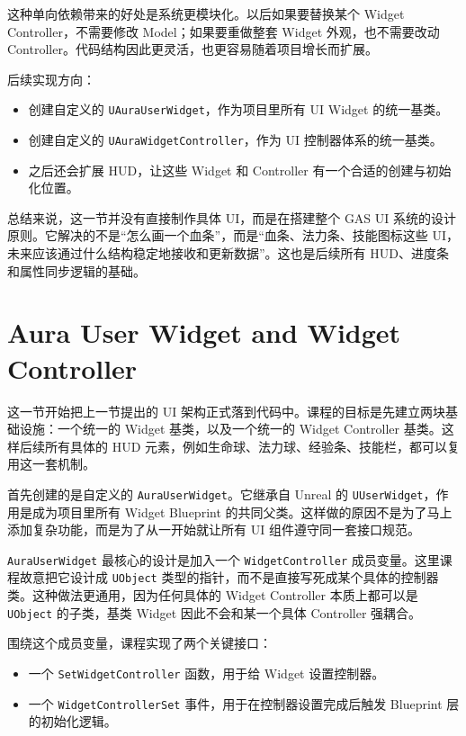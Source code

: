 这种单向依赖带来的好处是系统更模块化。以后如果要替换某个 Widget Controller，不需要修改 Model；如果要重做整套 Widget 外观，也不需要改动 Controller。代码结构因此更灵活，也更容易随着项目增长而扩展。

后续实现方向：
\begin{itemize}
	\item 创建自定义的 \texttt{UAuraUserWidget}，作为项目里所有 UI Widget 的统一基类。
	\item 创建自定义的 \texttt{UAuraWidgetController}，作为 UI 控制器体系的统一基类。
	\item 之后还会扩展 HUD，让这些 Widget 和 Controller 有一个合适的创建与初始化位置。
\end{itemize}

总结来说，这一节并没有直接制作具体 UI，而是在搭建整个 GAS UI 系统的设计原则。它解决的不是“怎么画一个血条”，而是“血条、法力条、技能图标这些 UI，未来应该通过什么结构稳定地接收和更新数据”。这也是后续所有 HUD、进度条和属性同步逻辑的基础。
\section{Aura User Widget and Widget Controller}

这一节开始把上一节提出的 UI 架构正式落到代码中。课程的目标是先建立两块基础设施：一个统一的 Widget 基类，以及一个统一的 Widget Controller 基类。这样后续所有具体的 HUD 元素，例如生命球、法力球、经验条、技能栏，都可以复用这一套机制。

首先创建的是自定义的 \texttt{AuraUserWidget}。它继承自 Unreal 的 \texttt{UUserWidget}，作用是成为项目里所有 Widget Blueprint 的共同父类。这样做的原因不是为了马上添加复杂功能，而是为了从一开始就让所有 UI 组件遵守同一套接口规范。

\texttt{AuraUserWidget} 最核心的设计是加入一个 \texttt{WidgetController} 成员变量。这里课程故意把它设计成 \texttt{UObject} 类型的指针，而不是直接写死成某个具体的控制器类。这种做法更通用，因为任何具体的 Widget Controller 本质上都可以是 \texttt{UObject} 的子类，基类 Widget 因此不会和某一个具体 Controller 强耦合。

围绕这个成员变量，课程实现了两个关键接口：
\begin{itemize}
	\item 一个 \texttt{SetWidgetController} 函数，用于给 Widget 设置控制器。
	\item 一个 \texttt{WidgetControllerSet} 事件，用于在控制器设置完成后触发 Blueprint 层的初始化逻辑。
\end{itemize}

